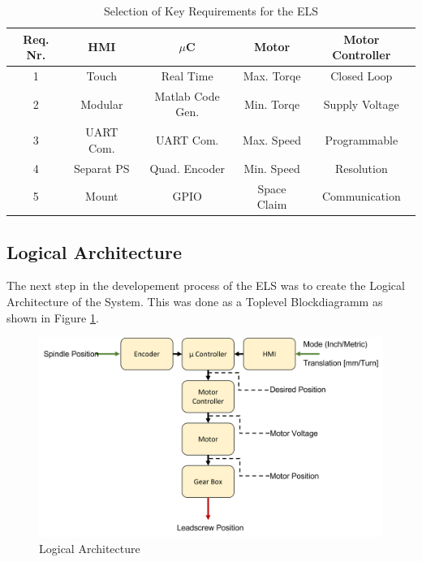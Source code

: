 \begin{table}
    \centering
     \begin{tabular}{||c|c|c|c|c||} 
        \hline
        Req. Nr. & HMI & $\mu$C & Motor & Motor Controller \\ [0.5ex] 
        \hline\hline
        1 & Touch       & Real Time         &  Max. Torqe   & Closed Loop   \\ 
        2 & Modular     & Matlab Code Gen.  &  Min. Torqe   & Supply Voltage\\
        3 & UART Com.   & UART Com.         &  Max. Speed   & Programmable  \\
        4 & Separat PS  & Quad. Encoder     &  Min. Speed   & Resolution    \\
        5 & Mount       & GPIO              &  Space Claim  & Communication \\ [1ex] 
        \hline
     \end{tabular}
     \caption{Selection of Key Requirements for the ELS}
     \label{Tab Key Requirements}
\end{table}




\subsection{Logical Architecture}

The next step in the developement process of the ELS was to create the Logical Architecture of the System. This was done as a Toplevel Blockdiagramm as shown in Figure \ref{Logical Architecture}.

\begin{figure}
    \begin{center}
    \includegraphics[width=12cm]{Pictures/Logical Architecture.png}
    \caption[Logical Architecture]{Logical Architecture}
    \label{Logical Architecture}
    \end{center}
\end{figure}

